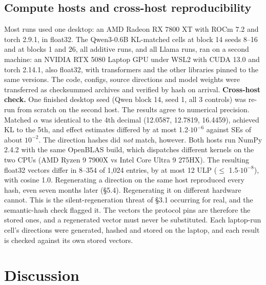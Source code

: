 \documentclass[
  10pt,
]{article}
\begin{document}
\subsection{Compute hosts and cross-host
reproducibility}\label{compute-hosts-and-cross-host-reproducibility}

Most runs used one desktop: an AMD Radeon RX 7800 XT with ROCm 7.2 and
torch 2.9.1, in float32. The Qwen3-0.6B KL-matched cells at block 14
seeds 8--16 and at blocks 1 and 26, all additive runs, and all Llama
runs, ran on a second machine: an NVIDIA RTX 5080 Laptop GPU under WSL2
with CUDA 13.0 and torch 2.14.1, also float32, with transformers and the
other libraries pinned to the same versions. The code, configs, source
directions and model weights were transferred as checksummed archives
and verified by hash on arrival. \textbf{Cross-host check.} One finished
desktop seed (Qwen block 14, seed 1, all 3 controls) was re-run from
scratch on the second host. The results agree to numerical precision.
Matched $\alpha$ was identical to the 4th decimal (12.0587, 12.7819, 16.4459),
achieved KL to the 5th, and effect estimates differed by at most
1.2$\cdot$$10^{-6}$ against SEs of about $10^{-2}$. The direction hashes did \emph{not}
match, however. Both hosts run NumPy 2.4.2 with the same OpenBLAS build,
which dispatches different kernels on the two CPUs (AMD Ryzen 9 7900X vs
Intel Core Ultra 9 275HX). The resulting float32 vectors differ in
8--354 of 1,024 entries, by at most 12 ULP ($\le$ 1.5$\cdot$$10^{-8}$), with cosine
1.0. Regenerating a direction on the same host reproduced every hash,
even seven months later (§5.4). Regenerating it on different hardware
cannot. This is the silent-regeneration threat of §3.1 occurring for
real, and the semantic-hash check flagged it. The vectors the protocol
pins are therefore the stored ones, and a regenerated vector must never
be substituted. Each laptop-run cell's directions were generated, hashed
and stored on the laptop, and each result is checked against its own
stored vectors.

\section{Discussion}\label{discussion}
\end{document}
